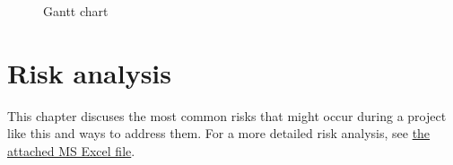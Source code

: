 \documentclass{report}
\begin{document}
	\begin{figure}[h]
		\centering
		\caption{Gantt chart}
		\label{fig:gantt}
	\end{figure}
	
	
	
	\chapter{Risk analysis}
	This chapter discuses the most common risks that might occur during a project like this and ways to address them. For a more detailed risk analysis, see \href{run: ./risk_analysis.xlsm}{the attached MS Excel file}. 
	
\end{document}
